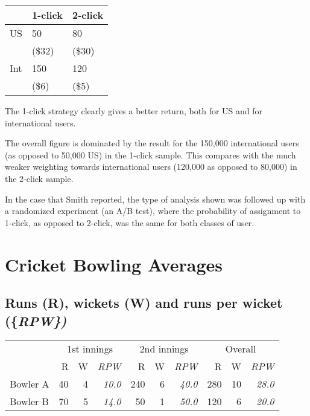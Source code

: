 \documentclass[
  10ptls,
  b5paper]{book}
\begin{document}
\begin{longtable}[]{@{}lll@{}}
\toprule\noalign{}
& 1-click & 2-click \\
\midrule\noalign{}
\endhead
\bottomrule\noalign{}
\endlastfoot
US & 50 & 80 \\
& (\$32) & (\$30) \\
Int & 150 & 120 \\
& (\$6) & (\$5) \\
\end{longtable}

The 1-click strategy clearly gives a better return, both for US and for international users.

The overall figure is dominated by the result for the 150,000 international users (as opposed to 50,000 US) in the 1-click sample. This compares with the much weaker weighting towards international users (120,000 as opposed to 80,000) in the 2-click sample.

In the case that Smith reported, the type of analysis shown was followed up with a randomized experiment (an A/B test), where the probability of assignment to 1-click, as opposed to 2-click, was the same for both classes of user.

\section{Cricket Bowling Averages}\label{cricket-bowling-averages}

\subsection*{\texorpdfstring{Runs (R), wickets (W) and runs per wicket (\{\em RPW\})}{Runs (R), wickets (W) and runs per wicket (\{\})}}\label{runs-r-wickets-w-and-runs-per-wicket}

\vspace*{-8pt}

\begin{center}
\begin{tabular}{lrrr||rrr||rrr}
\hline
 & \multicolumn{3}{c}{1st innings} & \multicolumn{3}{c}{2nd innings} &
\multicolumn{3}{c}{Overall} \\
\cline{2-4} \cline{5-7} \cline{8-10}
& R & W & {\em RPW}   & R & W & {\em RPW} & R & W
& {\em RPW}\\
Bowler A & 40 & 4 & {\em 10.0} & 240 & 6 & {\em 40.0} & 280 & 10 &
{\em 28.0}\\
Bowler B & 70 & 5 & {\em 14.0} & 50 & 1 & {\em 50.0} & 120 & 6 & {\em 20.0} \\
\hline
\end{tabular}
\end{center}
\end{document}
